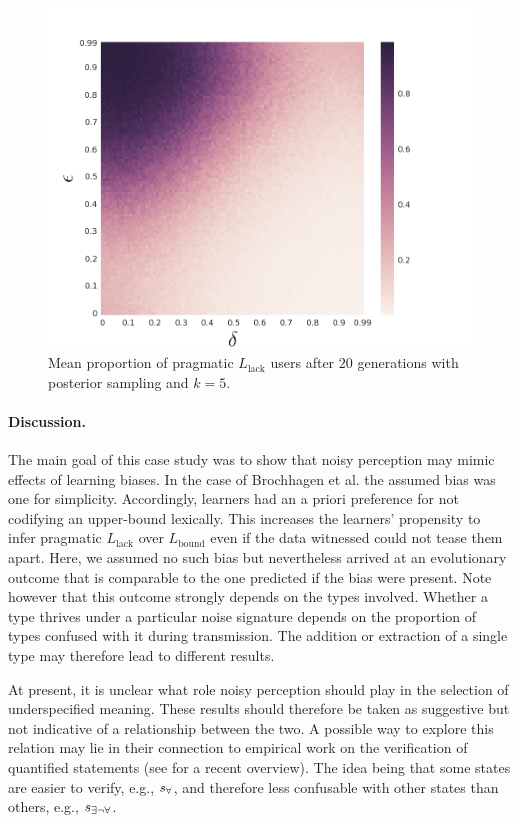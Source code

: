 \documentclass[10pt,a4paper]{article}
\newcommand{\state}{\ensuremath{s}\xspace}		%
\newcommand{\mystate}[1]{\ensuremath{\state_{\text{#1}}}\xspace} %
\newcommand{\ssome}{\mystate{\ensuremath{\exists\neg\forall}}}
\newcommand{\sall}{\mystate{\ensuremath{\forall}}}
\begin{document}
\begin{figure}[ht]
\centering
    \includegraphics[scale=0.33]{../code/plots/quantifiers-posterior-sampling-k5.png}
  \caption{Mean proportion of pragmatic $L_{\text{lack}}$ users after $20$ generations with posterior sampling and $k = 5$.}
  \label{fig:quant}
\end{figure}


\paragraph{Discussion.} The main goal of this case study was to show that noisy perception may
mimic effects of learning biases. In the case of Brochhagen et al. the assumed bias was one
for simplicity. Accordingly, learners had an a priori preference for not codifying an
upper-bound lexically. This increases the learners' propensity to infer pragmatic
$L_{\text{lack}}$ over $L_{\text{bound}}$ even if the data witnessed could not tease them
apart. Here, we assumed no such bias but nevertheless arrived at an evolutionary outcome that
is comparable to the one predicted if the bias were present. Note however that this outcome
strongly depends on the types involved. Whether a type thrives under a particular noise
signature depends on the proportion of types confused with it during transmission. The addition
or extraction of a single type may therefore lead to different results.

At present, it is unclear what role noisy perception should play in the selection of underspecified meaning. These results should therefore be taken as suggestive but not indicative of a relationship between the two. A possible way to explore this relation may lie in their connection to empirical work on the verification of quantified statements (see \citealt{szymanik:2016} for a recent overview). The idea being that some states are easier to verify, e.g., $\sall$, and therefore less confusable with other states than others, e.g., $\ssome$. 
\end{document}
